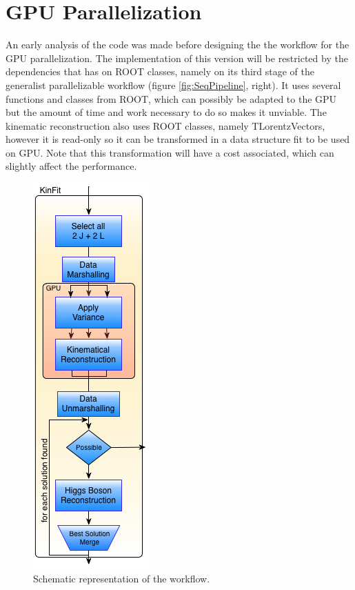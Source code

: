 \section{GPU Parallelization}
\label{Parallelization:GPU}

An early analysis of the code was made before designing the the workflow for the GPU parallelization. The implementation of this version will be restricted by the dependencies that \ttDilepKinFit has on ROOT classes, namely on its third stage of the generalist parallelizable workflow (figure \ref{fig:SeqPipeline}, right). It uses several functions and classes from ROOT, which can possibly be adapted to the GPU but the amount of time and work necessary to do so makes it unviable. The kinematic reconstruction also uses ROOT classes, namely TLorentzVectors, however it is read-only so it can be transformed in a data structure fit to be used on GPU. Note that this transformation will have a cost associated, which can slightly affect the performance.

\begin{figure}[!htp]
	\begin{center}
		\includegraphics[scale=0.5]{../../common/img/gpu_pipeline.png}
		\caption{Schematic representation of the \ttDilepKinFit workflow.}
		\label{fig:GPUPipeline}
	\end{center}
\end{figure}

